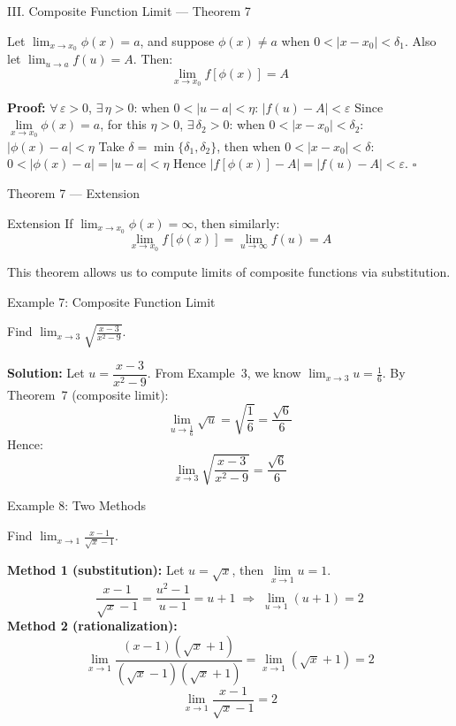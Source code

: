 \documentclass[UTF8,10pt]{beamer}
\begin{document}
\begin{frame}{III. Composite Function Limit --- Theorem 7}
\begin{theorem}
Let $\displaystyle \lim_{x\to x_0} \phi(x) = a$, and suppose $\phi(x) \neq a$ when $0 < |x-x_0| < \delta_1$. Also let $\displaystyle \lim_{u\to a} f(u) = A$. Then:
\[
\lim_{x\to x_0} f[\phi(x)] = A
\]
\end{theorem}
\pause
\textbf{Proof:} $\forall\,\varepsilon > 0$, $\exists\,\eta > 0$: when $0 < |u-a| < \eta$: $|f(u)-A| < \varepsilon$
\pause
Since $\lim\limits_{x\to x_0} \phi(x) = a$, for this $\eta > 0$, $\exists\,\delta_2 > 0$:
when $0 < |x-x_0| < \delta_2$: $|\phi(x)-a| < \eta$
\pause
Take $\delta = \min\{\delta_1, \delta_2\}$, then when $0 < |x-x_0| < \delta$:
$0 < |\phi(x)-a| = |u-a| < \eta$
\pause
Hence $|f[\phi(x)] - A| = |f(u) - A| < \varepsilon$. \hfill $\square$
\end{frame}

\begin{frame}{Theorem 7 --- Extension}
\begin{block}{Extension}
If $\displaystyle \lim_{x\to x_0} \phi(x) = \infty$, then similarly:
\[
\lim_{x\to x_0} f[\phi(x)] = \lim_{u\to\infty} f(u) = A
\]
\end{block}
\pause
\vspace{0.5em}
This theorem allows us to compute limits of composite functions via substitution.
\end{frame}

\begin{frame}{Example 7: Composite Function Limit}
\begin{example}
Find $\displaystyle \lim_{x\to 3} \sqrt{\frac{x-3}{x^2-9}}$.
\end{example}
\pause
\textbf{Solution:} Let $u = \dfrac{x-3}{x^2-9}$. From Example~3, we know
$\displaystyle \lim_{x\to 3} u = \frac{1}{6}$.
\pause
By Theorem~7 (composite limit):
\[
\lim_{u\to \frac{1}{6}} \sqrt{u} = \sqrt{\frac{1}{6}} = \frac{\sqrt{6}}{6}
\]
\pause
Hence:
\[
\boxed{\lim_{x\to 3} \sqrt{\frac{x-3}{x^2-9}} = \frac{\sqrt{6}}{6}}
\]
\end{frame}

\begin{frame}{Example 8: Two Methods}
\begin{example}
Find $\displaystyle \lim_{x\to 1} \frac{x-1}{\sqrt{x}-1}$.
\end{example}
\pause
\textbf{Method 1 (substitution):} Let $u = \sqrt{x}$, then $\lim\limits_{x\to 1} u = 1$.
\[
\frac{x-1}{\sqrt{x}-1} = \frac{u^2-1}{u-1} = u+1 \;\Longrightarrow\; \lim_{u\to 1}(u+1) = 2
\]
\pause
\textbf{Method 2 (rationalization):}
\[
\lim_{x\to 1} \frac{(x-1)(\sqrt{x}+1)}{(\sqrt{x}-1)(\sqrt{x}+1)} = \lim_{x\to 1} (\sqrt{x}+1) = 2
\]
\pause
\[
\boxed{\lim_{x\to 1} \frac{x-1}{\sqrt{x}-1} = 2}
\]
\end{frame}
\end{document}
